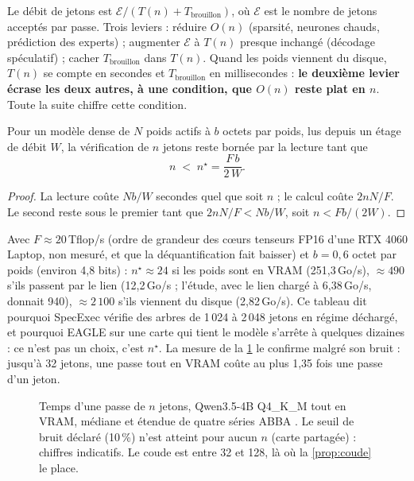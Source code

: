 Le débit de jetons est $\mathcal E / (T(n) + T_{\text{brouillon}})$, où $\mathcal E$ est le nombre de jetons acceptés par passe. Trois leviers : réduire $O(n)$ (sparsité, neurones chauds, prédiction des experts) ; augmenter $\mathcal E$ à $T(n)$ presque inchangé (décodage spéculatif) ; cacher $T_{\text{brouillon}}$ dans $T(n)$. Quand les poids viennent du disque, $T(n)$ se compte en secondes et $T_{\text{brouillon}}$ en millisecondes : \textbf{le deuxième levier écrase les deux autres, à une condition, que $O(n)$ reste plat en $n$}. Toute la suite chiffre cette condition.

\begin{proposition}\label{prop:coude}
Pour un modèle dense de $N$ poids actifs à $b$ octets par poids, lus depuis un étage de débit $W$, la vérification de $n$ jetons reste bornée par la lecture tant que
\begin{equation}\label{eq:coude}
n \;<\; n^\star = \frac{F\, b}{2\, W}.
\end{equation}
\end{proposition}

\begin{proof}
La lecture coûte $N b / W$ secondes quel que soit $n$ ; le calcul coûte $2 n N / F$. Le second reste sous le premier tant que $2nN/F < Nb/W$, soit $n < Fb/(2W)$.
\end{proof}

Avec $F \approx 20$\,Tflop/s (ordre de grandeur des cœurs tenseurs FP16 d'une RTX 4060 Laptop, non mesuré, et que la déquantification fait baisser) et $b = 0{,}6$ octet par poids (environ 4,8 bits) \calc : $n^\star \approx 24$ si les poids sont en VRAM (251,3\,Go/s), $\approx 490$ s'ils passent par le lien (12,2\,Go/s ; l'étude, avec le lien chargé à 6,38\,Go/s, donnait 940), $\approx 2\,100$ s'ils viennent du disque (2,82\,Go/s). Ce tableau dit pourquoi SpecExec vérifie des arbres de 1\,024 à 2\,048 jetons en régime déchargé, et pourquoi EAGLE sur une carte qui tient le modèle s'arrête à quelques dizaines : ce n'est pas un choix, c'est $n^\star$. La mesure de la \cref{fig:cn} le confirme malgré son bruit : jusqu'à 32 jetons, une passe tout en VRAM coûte au plus 1,35 fois une passe d'un jeton.

\begin{figure}[ht]
\centering
\GrapheCn
\caption[Le temps d'une passe de $n$ jetons]{Temps d'une passe de $n$ jetons, Qwen3.5-4B Q4\_K\_M tout en VRAM, médiane et étendue de quatre séries ABBA \mes. Le seuil de bruit déclaré (10\,\%) n'est atteint pour aucun $n$ (carte partagée) : chiffres indicatifs. Le coude est entre 32 et 128, là où la \cref{prop:coude} le place.}
\label{fig:cn}
\end{figure}

